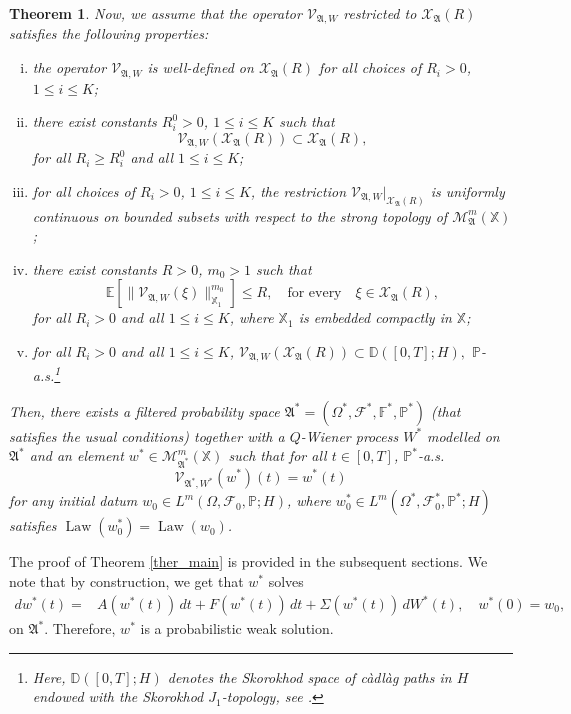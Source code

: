 \documentclass[english,a4paper,11pt]{amsart}
\theoremstyle{plain}
\newtheorem{theorem}{Theorem}[section]
\theoremstyle{definition}
\theoremstyle{remark}
\numberwithin{equation}{section}
\newcommand{\DeltaA}{A}
\newcommand{\Fcal} {{\mathcal F}}
\newcommand{\Mcal} {{\mathcal M}}
\newcommand{\Vcal} {{\mathcal V}}
\newcommand{\Xcal} {{\mathcal X}}
\newcommand{\Afrak} {{\mathfrak A}}
\renewcommand{\P}{\mathbb{P}}
\newcommand{\Eb}{\mathbb{E}}
\newcommand{\X}{\mathbb{X}}
\newcommand{\D}{\mathbb{D}}
\begin{document}
\begin{theorem}
		
	Now, we assume that the operator $\Vcal_{\Afrak,W}$ restricted to $\Xcal_{\Afrak}(R)$ satisfies the following	properties:
		\begin{enumerate}[(i)]
			\item\label{i} the operator $\Vcal_{\Afrak,W}$ is well-defined on $\Xcal_{\Afrak}(R)$ for all choices of $R_i>0$, $1\le i\le K$;
			\item\label{ii} there exist constants $R^0_i>0$, $1\le i\le K$ such that 
			\[\Vcal_{\Afrak,W}(\Xcal_{\Afrak}(R))\subset \Xcal_{\Afrak}(R),\]
			for all $R_i\ge R^0_i$ and all $1\le i\le K$;
			\item\label{iii} for all choices of $R_i>0$, $1\le i\le K$, the restriction $\Vcal_{\Afrak,W}\big\vert_{\Xcal_{\Afrak}(R)}$ is
			uniformly continuous on bounded subsets with respect to the strong topology of $\Mcal_{\Afrak}^{m}(\X)$;
			\item\label{iv} there exist constants $R>0$, $m_0>1$ such that
			\[
			\Eb\left[\|\Vcal_{\Afrak,W}(\xi)\|_{\mathbb{X}_1}^{m_0}\right]\le R,\quad\text{for every}\quad \xi\in\Xcal_{\Afrak}(R),
			\]
			for all $R_i>0$ and all $1\le i\le K$, where $\X_1 $ is embedded compactly in $\X$; 
			\item\label{v} for all $R_i>0$ and all $1\le i\le K$, $\Vcal_{\Afrak,W}(\Xcal_{\Afrak}(R))\subset \D([0,T];H),$ $\P$-a.s.\footnote{Here, $\mathbb{D}([0,T];H)$ denotes the
				Skorokhod space of c\`adl\`ag paths in $H$ endowed with the Skorokhod $J_1$-topology, see \cite[Appendix A2]{Kallenberg}.}
		\end{enumerate}
		Then, there exists a filtered probability space $\Afrak^\ast=(\Omega^\ast,\Fcal^\ast,\mathbb{F}^\ast,\P^\ast)$
		(that satisfies the usual
		conditions)
		together with a $Q$-Wiener process $W^\ast$ modelled on $\Afrak^\ast$
		and an element $w^\ast\in\Mcal_{\Afrak^\ast}^{m}(\X)$ such that
		for all $t\in[0,T]$, $\P^\ast$-a.s.
		\[
		\Vcal_{\Afrak^\ast,W^\ast}(w^\ast)(t)=w^\ast(t)
		\]
		for any initial datum $w_0\in L^m(\Omega,\Fcal_0,\P;H)$,
		where $w^\ast_0\in L^m(\Omega^\ast,\Fcal_0^\ast,\P^\ast;H)$ satisfies $\operatorname{Law}(w^\ast_0)=\operatorname{Law}(w_0)$.
	\end{theorem}
	
	
	
	
	The proof of Theorem \ref{ther_main} is provided in the subsequent sections. We note that
	by construction, we get that $w^\ast$ solves
	\begin{align*} 
		dw^\ast(t) =&\DeltaA (w^\ast(t))\, dt +F(w^\ast(t))\,dt +\Sigma(w^\ast(t))\,dW^\ast(t),\quad w^\ast(0)=w_0,
	\end{align*} 
	on $\Afrak^\ast$. Therefore, $w^\ast$ is a probabilistic weak solution.
	
\end{document}
